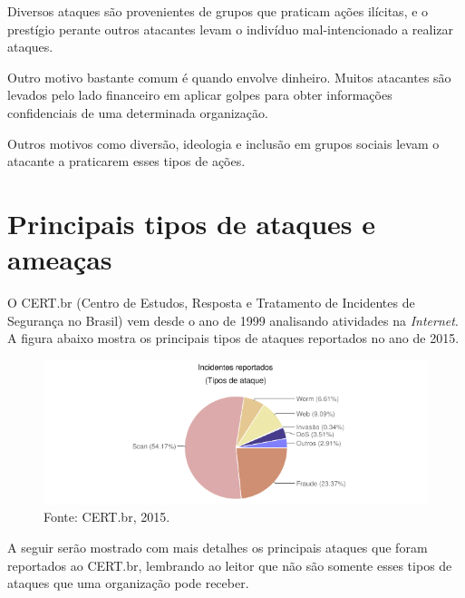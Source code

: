 Diversos ataques são provenientes de grupos que praticam ações ilícitas, e o prestígio perante outros atacantes levam o indivíduo mal-intencionado a realizar ataques.

Outro motivo bastante comum é quando envolve dinheiro. Muitos atacantes são levados pelo lado financeiro em aplicar golpes para obter informações confidenciais de uma determinada organização.

Outros motivos como diversão, ideologia e inclusão em grupos sociais levam o atacante a praticarem esses tipos de ações. 

\section{Principais tipos de ataques e ameaças}
O CERT.br (Centro de Estudos, Resposta e Tratamento de Incidentes de Segurança no Brasil) vem desde o ano de 1999 analisando atividades na \textit{Internet}. A figura abaixo mostra os principais tipos de ataques reportados no ano de 2015.

\begin{figure}[!h]
\centering
\includegraphics[width = 16cm]{tipos-ataque.png}
\caption{Fonte: CERT.br, 2015.} 	
\end{figure}

A seguir serão mostrado com mais detalhes os principais ataques que foram reportados ao CERT.br, lembrando ao leitor que não são somente esses tipos de ataques que uma organização pode receber.

